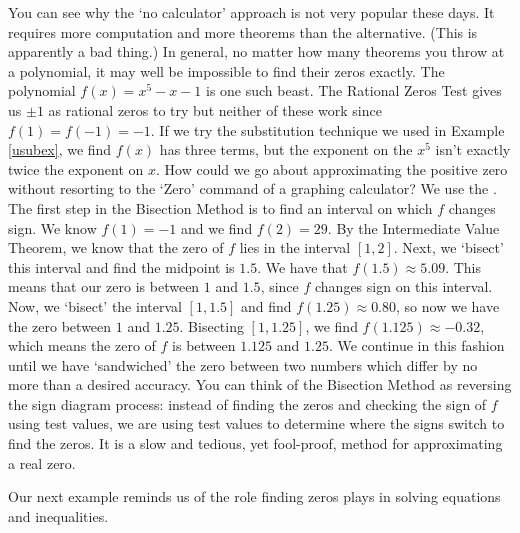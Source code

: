 You can see why the `no calculator' approach is not very popular these days.  It requires more computation and more theorems than the alternative. (This is apparently a bad thing.)  In general, no matter how many theorems you throw at a polynomial, it may well be impossible to find their zeros exactly.  The polynomial $f(x) = x^5-x-1$ is one such beast.   The Rational Zeros Test gives us $\pm 1$ as rational zeros to try but neither of these work since $f(1) = f(-1) = -1$.  If we try the substitution technique we used in Example \ref{usubex}, we find $f(x)$ has three terms, but the exponent on the $x^5$ isn't exactly twice the exponent on $x$.  How could we go about approximating the positive zero without resorting to the `Zero' command of a graphing calculator?  We use the  .  The first step in the Bisection Method is to find an interval on which $f$ changes sign.  We know $f(1) = -1$ and we find $f(2) = 29$.  By the Intermediate Value Theorem, we know that the zero of $f$ lies in the interval $[1,2]$.  Next, we `bisect' this interval and find the midpoint is $1.5$.  We have that $f(1.5)\approx 5.09$.  This means that our zero is between $1$ and $1.5$, since $f$ changes sign on this interval.  Now, we `bisect' the interval $[1,1.5]$ and find $f(1.25) \approx 0.80$, so now we have the zero between $1$ and $1.25$.  Bisecting $[1,1.25]$, we find $f(1.125) \approx -0.32$, which means the zero of $f$ is between $1.125$ and $1.25$.  We continue in this fashion until we have `sandwiched' the zero between two numbers which differ by no more than a desired accuracy. You can think of the Bisection Method as reversing the sign diagram process:  instead of finding the zeros and checking the sign of $f$ using test values, we are using test values to determine where the signs switch to find the zeros.  It is a slow and tedious, yet fool-proof, method for approximating a real zero.  

{}

Our next example reminds us of the role finding zeros plays in solving equations and inequalities.

